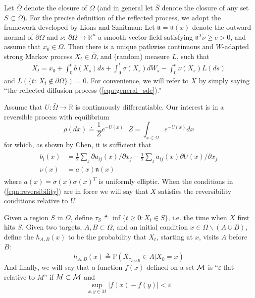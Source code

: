 \documentclass[nofootinbib,english, aip, jcp, priprint, graphicx,floatfix]{revtex4-1}
\theoremstyle{plain}
\theoremstyle{definition}
\theoremstyle{plain}
\newcommand{\normal}{{\mathfrak{n}}}
\begin{document}
Let $\bar \Omega$ denote the closure of $\Omega$ (and in general let $\bar S$ denote the closure of any set $S\subset \bar \Omega$).  For the precise definition of the reflected process, we adopt the framework developed by Lions and Sznitman\cite{lions1984stochastic}: Let $\normal=\normal(x)$ denote the outward normal of $\partial \Omega$ and $\nu:\ \partial \Omega \rightarrow \mathbb{R}^n$ a smooth vector field satisfying $\normal^T\nu\geq c>0$, and assume that $x_0 \in \Omega$.  Then there is a unique pathwise continuous
and $W$-adapted strong Markov process $X_t\in\bar\Omega$, and (random) measure $L$, such that 
\begin{gather}\label{eq:SDER}
X_t = x_0 + \int_0^t b(X_s)ds + \int_0^t \sigma(X_s)dW_s - \int_0^t \nu(X_s) L(ds)
\end{gather}
and $L(\{t:\ X_t \notin \partial \Omega\})=0$. 
For convenience, we will refer to $X$ by simply saying ``the reflected diffusion process (\ref{equ:general_sde}).'' 

Assume that $U:\bar \Omega \rightarrow \mathbb{R}$ is continuously differentiable. Our interest is in a reversible process with equilibrium  
\[
\rho(dx)\doteq \frac{1}{Z}e^{-U(x)}\ \ \
Z=\int_{x\in\Omega}e^{-U(x)}dx
\]
for which, as shown by Chen\cite{chen1993reflecting}, it is sufficient that 
\begin{align}
\begin{split}
b_i(x)&=\frac{1}{2} \sum_j \partial a_{ij}(x)/\partial x_j - \frac{1}{2}\sum_j a_{ij}(x) \partial U(x)/\partial x_j 
\label{eqn:reversibility} \\
\nu(x)&= a(x) \normal(x) 
\end{split}
\end{align}
where $a(x)=\sigma(x)\sigma(x)^T$ is uniformly elliptic.
When the conditions in (\ref{eqn:reversibility}) are in force
we will say that $X$ satisfies the reversibility conditions relative to $U$.

Given a region $S$ in $\Omega$,  define $\tau_S \triangleq \inf \{ t \geqslant 0 : X_t \in S \}$, i.e. the time when $X$ first hits $S$. Given two targets, $A,B\subset \Omega$, and an initial condition $x\in\Omega\backslash(A\cup B)$, define the $h_{A,B}(x)$ to
be the probability that $X_t$, starting at $x$, visits $A$ before $B$:
\[ h_{A, B}(x) \triangleq \mathbb{P}(X_{\tau_{A\cup B}}\in A|X_0=x)\]
And finally, we will say that a function $f(x)$ defined on a set
${\cal M}$ is 
``$\varepsilon$-flat relative to $M$'' if $M\subset {\cal M}$ and
\[
\sup_{x, y \in M} |f(x) - f(y)| < \varepsilon
\]
\end{document}
